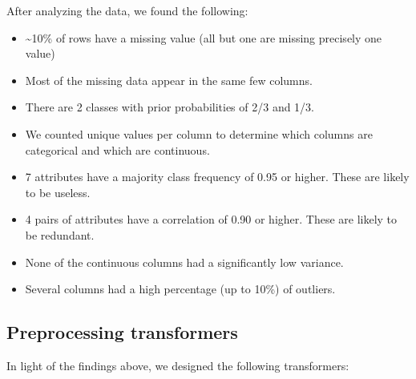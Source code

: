 \documentclass[
]{article}
\begin{document}
After analyzing the data, we found the following:
\begin{itemize}
\item \textasciitilde10\% of rows have a missing value (all but one are missing precisely one value)
\item Most of the missing data appear in the same few columns.
\item There are 2 classes with prior probabilities of 2/3 and 1/3.
\item We counted unique values per column to determine which columns are categorical and which are continuous.
\item 7 attributes have a majority class frequency of 0.95 or higher. These are likely to be useless.
\item 4 pairs of attributes have a correlation of 0.90 or higher. These are likely to be redundant.
\item None of the continuous columns had a significantly low variance.
\item Several columns had a high percentage (up to 10\%) of outliers.
\end{itemize}
	
\hypertarget{preprocessing-transformers}{%
\subsection{Preprocessing
transformers}\label{preprocessing-transformers}}

In light of the findings above, we designed the following transformers:
\end{document}
